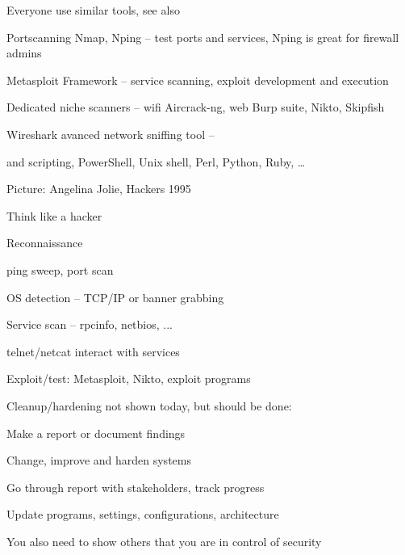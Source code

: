 \documentclass[Screen16to9,17pt]{foils}
\begin{document}
\begin{list2}
\item Everyone use similar tools, see also 
\item Portscanning Nmap, Nping -- test ports and services, Nping is great for firewall admins 
\item Metasploit Framework -- service scanning, exploit development and execution 
\item Dedicated niche scanners -- wifi Aircrack-ng, web Burp suite, Nikto, Skipfish 
\item Wireshark avanced network sniffing tool -- 
\item and scripting, PowerShell, Unix shell, Perl, Python, Ruby, \ldots
\end{list2}

Picture: Angelina Jolie, Hackers 1995





\begin{list1}
\item Think like a hacker
\item Reconnaissance
\begin{list2}
\item ping sweep, port scan
\item OS detection -- TCP/IP or banner grabbing
\item Service scan -- rpcinfo, netbios, ...
\item telnet/netcat interact with services
\end{list2}
\item Exploit/test: Metasploit, Nikto, exploit programs
\item Cleanup/hardening not shown today, but should be done:
\begin{list2}
\item Make a report or document findings
\item Change, improve and harden systems
\item Go through report with stakeholders, track progress
\item Update programs, settings, configurations, architecture
\end{list2}
\item You also need to show others that you are in control of security
\end{list1}
\end{document}
